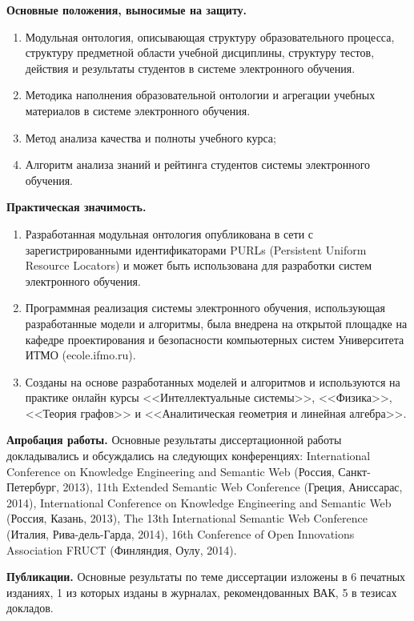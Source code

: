 \textbf{Основные положения, выносимые на защиту.}
\begin{enumerate}
 \item Модульная онтология, описывающая структуру образовательного процесса, структуру предметной области учебной дисциплины, структуру тестов, действия и результаты студентов в системе электронного обучения.
 \item Методика наполнения образовательной онтологии и агрегации учебных материалов в системе электронного обучения.
 \item Метод анализа качества и полноты учебного курса;
 \item Алгоритм анализа знаний и рейтинга студентов системы электронного обучения.
 \end{enumerate}


\textbf{Практическая значимость.}
\begin{enumerate}
 \item Разработанная модульная онтология опубликована в сети с зарегистрированными идентификаторами PURLs (Persistent Uniform Resource Locators) и может быть использована для разработки систем электронного обучения.
 \item Программная реализация системы электронного обучения, использующая разработанные модели и алгоритмы, была внедрена на открытой площадке на кафедре проектирования и безопасности компьютерных систем Университета ИТМО (ecole.ifmo.ru). 
 \item Созданы на основе разработанных моделей и алгоритмов и используются на практике онлайн курсы 
<<Интеллектуальные системы>>, <<Физика>>, <<Теория графов>> и <<Аналитическая геометрия и линейная алгебра>>.
 \end{enumerate}
 
 


\textbf{Апробация работы.}
Основные результаты диссертационной работы докладывались и обсуждались на следующих конференциях:
International Conference on Knowledge Engineering and Semantic Web (Россия, Санкт-Петербург, 2013),
11th Extended Semantic Web Conference (Греция, Аниссарас, 2014), International Conference on Knowledge Engineering and Semantic Web (Россия, Казань, 2013), The 13th International Semantic Web Conference (Италия, Рива-дель-Гарда, 2014), 16th Conference of Open
Innovations Association FRUCT (Финляндия, Оулу, 2014).

\textbf{Публикации.} Основные результаты по теме диссертации изложены в 6 печатных изданиях, 1 из которых изданы в журналах, рекомендованных ВАК, 5 в тезисах докладов.

